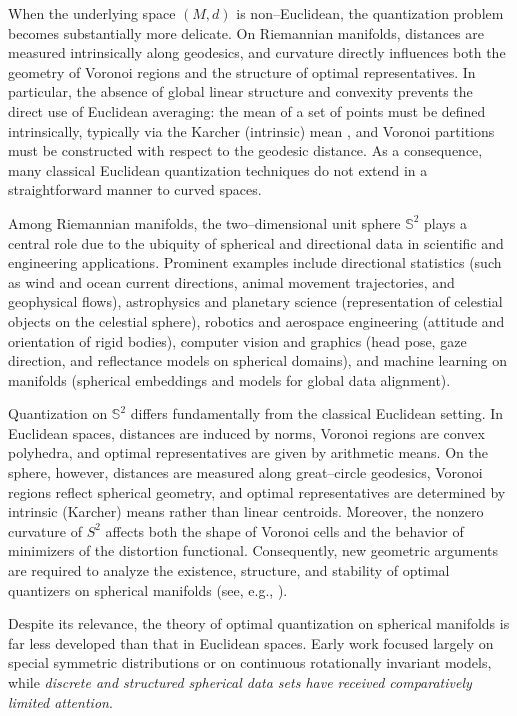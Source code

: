 \documentclass[12pt, reqno]{amsart}
\theoremstyle{plain}
\theoremstyle{definition}
\newcommand{\D}[1]{\mathbb{#1}}%
\begin{document}
When the underlying space $(M,d)$ is non--Euclidean, the quantization problem becomes substantially more delicate. On Riemannian manifolds, distances are measured intrinsically along geodesics, and curvature directly influences both the geometry of Voronoi regions and the structure of optimal representatives. In particular, the absence of global linear structure and convexity prevents the direct use of Euclidean averaging: the mean of a set of points must be defined intrinsically, typically via the Karcher (intrinsic) mean \cite{Karcher1977,Afsari2011}, and Voronoi partitions must be constructed with respect to the geodesic distance. As a consequence, many classical Euclidean quantization techniques do not extend in a straightforward manner to curved spaces.

Among Riemannian manifolds, the two--dimensional unit sphere $\D S^{2}$ plays a central role due to the ubiquity of spherical and directional data in scientific and engineering applications. Prominent examples include directional statistics (such as wind and ocean current directions, animal movement trajectories, and geophysical flows), astrophysics and planetary science (representation of celestial objects on the celestial sphere), robotics and aerospace engineering (attitude and orientation of rigid bodies), computer vision and graphics (head pose, gaze direction, and reflectance models on spherical domains), and machine learning on manifolds (spherical embeddings and models for global data alignment).

Quantization on $\D S^{2}$ differs fundamentally from the classical Euclidean setting. In Euclidean spaces, distances are induced by norms, Voronoi regions are convex polyhedra, and optimal representatives are given by arithmetic means. On the sphere, however, distances are measured along great--circle geodesics, Voronoi regions reflect spherical geometry, and optimal representatives are determined by intrinsic (Karcher) means rather than linear centroids. Moreover, the nonzero curvature of $S^{2}$ affects both the shape of Voronoi cells and the behavior of minimizers of the distortion functional. Consequently, new geometric arguments are required to analyze the existence, structure, and stability of optimal quantizers on spherical manifolds (see, e.g., \cite{GrafLuschgy2000,Karcher1977,Afsari2011,Pennec2006}).

Despite its relevance, the theory of optimal quantization on spherical manifolds is far less developed than that in Euclidean spaces. Early work focused largely on special symmetric distributions or on continuous rotationally invariant models, while \emph{discrete and structured spherical data sets have received comparatively limited attention}.
\end{document}
